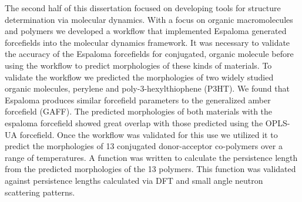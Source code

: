 The second half of this dissertation focused on developing tools for structure determination via molecular dynamics. With a focus on organic macromolecules and polymers we developed a workflow that implemented Espaloma generated forcefields into the molecular dynamics framework. It was necessary to validate the accuracy of the Espaloma forcefields for conjugated, organic molecule before using the workflow to predict morphologies of these kinds of materials. To validate the workflow we predicted the morphologies of two widely studied organic molecules, perylene and poly-3-hexylthiophene (P3HT). We found that Espaloma produces similar forcefield parameters to the generalized amber forcefield (GAFF). The predicted morphologies of both materials with the espaloma forcefield showed great overlap with those predicted using the OPLS-UA forcefield. Once the workflow was validated for this use we utilized it to predict the morphologies of 13 conjugated donor-acceptor co-polymers over a range of temperatures. A function was written to calculate the persistence length from the predicted morphologies of the 13 polymers. This function was validated against persistence lengths calculated via DFT and small angle neutron scattering patterns. 